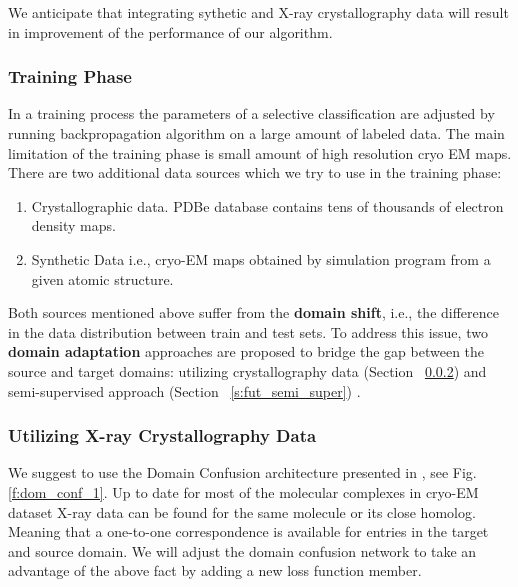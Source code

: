 We anticipate that integrating sythetic and X-ray crystallography data will result in  improvement of  the performance of our algorithm.

\subsubsection{Training Phase}
In a training process the parameters of a selective classification are adjusted by running backpropagation algorithm on a large amount of labeled data. 
The main limitation of the training phase is small amount of high resolution cryo EM maps.
There are two additional data sources which we try to use in the training phase:
\begin{enumerate}
    \item Crystallographic data. PDBe database \cite{Velankar2012} contains tens of thousands of electron density maps.
    \item Synthetic Data i.e., cryo-EM maps obtained by simulation program from a given atomic structure.  
\end{enumerate}
Both sources mentioned above suffer from the \textbf{domain shift}, i.e., the difference in the data distribution between train and test sets. 
To address this issue, two \textbf{domain adaptation} approaches are proposed to bridge the gap between the source and target domains: utilizing crystallography data (Section ~\ref{s:fut_xray}) and semi-supervised approach (Section ~\ref{s:fut_semi_super}) .


\subsubsection{Utilizing X-ray Crystallography Data }\label{s:fut_xray}
We suggest to use the Domain Confusion architecture presented in \cite{Hoffman2017}, see Fig. \ref{f:dom_conf_1}.
Up to  date for most of the molecular   complexes in cryo-EM dataset  X-ray data can be found for the same molecule or its close homolog.
Meaning that a one-to-one correspondence is available for entries in the target and source domain.
We will adjust the domain confusion network to take an advantage of the above fact by adding a new loss function member.

